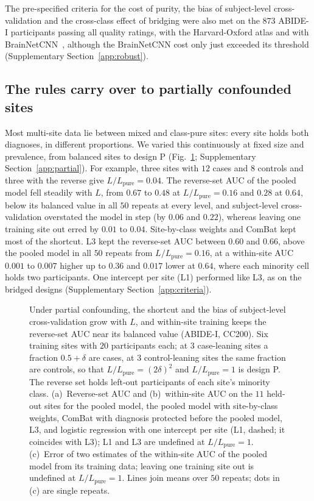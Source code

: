 The pre-specified criteria for the cost of purity, the bias of subject-level cross-validation and the cross-class effect of bridging were also met on the $873$ ABIDE-I participants passing all quality ratings, with the Harvard-Oxford atlas and with BrainNetCNN~\cite{kawahara2017}, although the BrainNetCNN cost only just exceeded its threshold (Supplementary Section~\ref{app:robust}).


\subsection{The rules carry over to partially confounded sites}\label{sec:res-partial}

Most multi-site data lie between mixed and class-pure sites: every site holds both diagnoses, in different proportions. We varied this continuously at fixed size and prevalence, from balanced sites to design P (Fig.~\ref{fig:partial}; Supplementary Section~\ref{app:partial}). For example, three sites with $12$ cases and $8$ controls and three with the reverse give $L/L_{\mathrm{pure}}=0.04$. The reverse-set AUC of the pooled model fell steadily with $L$, from $0.67$ to $0.48$ at $L/L_{\mathrm{pure}}=0.16$ and $0.28$ at $0.64$, below its balanced value in all $50$ repeats at every level, and subject-level cross-validation overstated the model in step (by $0.06$ and $0.22$), whereas leaving one training site out erred by $0.01$ to $0.04$. Site-by-class weights and ComBat kept most of the shortcut. L3 kept the reverse-set AUC between $0.60$ and $0.66$, above the pooled model in all $50$ repeats from $L/L_{\mathrm{pure}}=0.16$, at a within-site AUC $0.001$ to $0.007$ higher up to $0.36$ and $0.017$ lower at $0.64$, where each minority cell holds two participants. One intercept per site (L1) performed like L3, as on the bridged designs (Supplementary Section~\ref{app:criteria}).

\begin{figure}[tbp]
\centering
{}
\caption{Under partial confounding, the shortcut and the bias of subject-level cross-validation grow with $L$, and within-site training keeps the reverse-set AUC near its balanced value (ABIDE-I, CC200). Six training sites with $20$ participants each; at $3$ case-leaning sites a fraction $0.5+\delta$ are cases, at $3$ control-leaning sites the same fraction are controls, so that $L/L_{\mathrm{pure}}=(2\delta)^2$ and $L/L_{\mathrm{pure}}=1$ is design P. The reverse set holds left-out participants of each site's minority class. (a)~Reverse-set AUC and (b)~within-site AUC on the $11$ held-out sites for the pooled model, the pooled model with site-by-class weights, ComBat with diagnosis protected before the pooled model, L3, and logistic regression with one intercept per site (L1, dashed; it coincides with L3); L1 and L3 are undefined at $L/L_{\mathrm{pure}}=1$. (c)~Error of two estimates of the within-site AUC of the pooled model from its training data; leaving one training site out is undefined at $L/L_{\mathrm{pure}}=1$. Lines join means over $50$ repeats; dots in (c) are single repeats.}
\label{fig:partial}
\end{figure}
